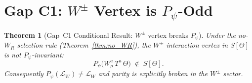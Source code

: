 \documentclass[12pt,a4paper]{article}
\newtheorem{theorem}{Theorem}[section]
\theoremstyle{definition}
\theoremstyle{remark}
\begin{document}
\section{Gap C1: $W^\pm$ Vertex is $P_\psi$-Odd}
\label{sec:gap_C1}

\begin{theorem}[Gap~C1 Conditional Result: $W^\pm$ vertex breaks $P_\psi$]
\label{thm:gap_C1}
Under the no-$W_R$ selection rule (Theorem~\ref{thm:no_WR}), the
$W^\pm$ interaction vertex in $S[\Theta]$ is not $P_\psi$-invariant:
\begin{equation}
  P_\psi \bigl(W^a_\mu\,T^a\,\Theta\bigr)
  \;\notin\; S[\Theta].
\end{equation}
Consequently $P_\psi(\mathcal{L}_W) \neq \mathcal{L}_W$ and parity is
explicitly broken in the $W^\pm$ sector.
\end{theorem}
\end{document}
